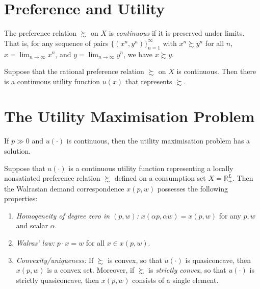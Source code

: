 \section{Preference and Utility}

\begin{defn}
    The preference relation $\succsim$ on $X$ is \emph{continuous} if it is preserved under limits. That is, for any sequence of pairs $\{(x^n, y^n)\}^\infty_{n = 1}$ with $x^n \succsim y^n$ for all $n$, $x = \lim_{n \to \infty} x^n$, and $y = \lim_{n \to \infty} y^n$, we have $x \succsim y$.
\end{defn}

\begin{prop}
    Suppose that the rational preference relation $\succsim$ on $X$ is continuous. Then there is a continuous utility function $u(x)$ that represents $\succsim$.
\end{prop}


\section{The Utility Maximisation Problem}

\begin{prop}
    If $p \gg 0$ and $u(\cdot)$ is continuous, then the utility maximisation problem has a solution.
\end{prop}

\begin{prop}
    Suppose that $u(\cdot)$ is a continuous utility function representing a locally nonsatiated preference relation $\succsim$ defined on a consumption set $X = \mathbb{R}^L_+$. Then the Walrasian demand correspondence $x(p, w)$ possesses the following properties:
    \begin{enumerate}
        \item \emph{Homogeneity of degree zero in $(p, w)$:} $x(\alpha p, \alpha w) = x(p, w)$ for any $p, w$ and scalar $\alpha$.
        \item \emph{Walras' law:} $p \cdot x = w$ for all $x \in x(p, w)$.
        \item \emph{Convexity/uniqueness:} If $\succsim$ is convex, so that $u(\cdot)$ is quasiconcave, then $x(p, w)$ is a convex set. Moreover, if $\succsim$ is \emph{strictly convex}, so that $u(\cdot)$ is strictly quasiconcave, then $x(p, w)$ consists of a single element.
    \end{enumerate}
\end{prop}

